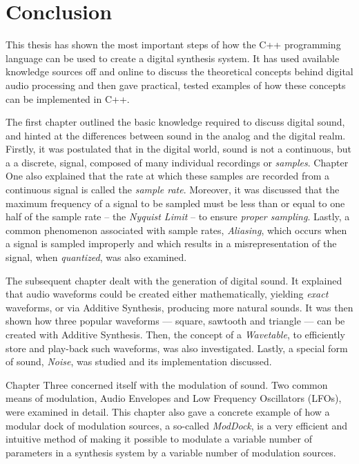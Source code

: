 \chapter*{Conclusion}

This thesis has shown the most important steps of how the C++ programming language can be used to create a digital synthesis system. It has used available knowledge sources off and online to discuss the theoretical concepts behind digital audio processing and then gave practical, tested examples of how these concepts can be implemented in C++. \parbreak

The first chapter outlined the basic knowledge required to discuss digital sound, and hinted at the differences between sound in the analog and the digital realm. Firstly, it was postulated that in the digital world, sound is not a continuous, but a a discrete, signal, composed of many individual recordings or \emph{samples}. Chapter One also explained that the rate at which these samples are recorded from a continuous signal is called the \emph{sample rate}. Moreover, it was discussed that the maximum frequency of a signal to be sampled must be less than or equal to one half of the sample rate -- the \emph{Nyquist Limit} -- to ensure \emph{proper sampling}. Lastly, a common phenomenon associated with sample rates, \emph{Aliasing}, which occurs when a signal is sampled improperly and which results in a misrepresentation of the signal, when \emph{quantized}, was also examined. \parbreak

The subsequent chapter dealt with the generation of digital sound. It explained that audio waveforms could be created either mathematically, yielding \emph{exact} waveforms, or via Additive Synthesis, producing more natural sounds. It was then shown how three popular waveforms --- square, sawtooth and triangle --- can be created with Additive Synthesis. Then, the concept of a \emph{Wavetable}, to efficiently store and play-back such waveforms, was also investigated. Lastly, a special form of sound, \emph{Noise}, was studied and its implementation discussed. \parbreak

Chapter Three concerned itself with the modulation of sound. Two common means of modulation, Audio Envelopes and Low Frequency Oscillators (LFOs), were examined in detail. This chapter also gave a concrete example of how a modular dock of modulation sources, a so-called \emph{ModDock}, is a very efficient and intuitive method of making it possible to modulate a variable number of parameters in a synthesis system by a variable number of modulation sources. \parbreak


